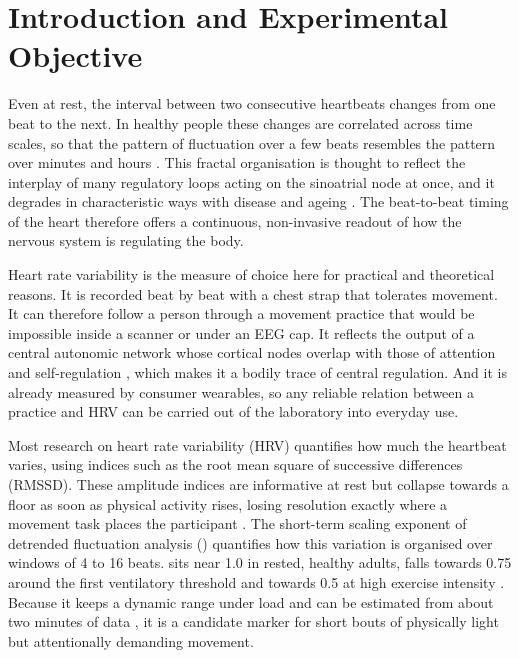 \section{Introduction and Experimental Objective}
\label{sec:intro}

Even at rest, the interval between two consecutive heartbeats changes from one beat to the next. In healthy people these changes are correlated across time scales, so that the pattern of fluctuation over a few beats resembles the pattern over minutes and hours \citep{peng1995,goldberger2002}. This fractal organisation is thought to reflect the interplay of many regulatory loops acting on the sinoatrial node at once, and it degrades in characteristic ways with disease and ageing \citep{lipsitz1992,goldberger2002}. The beat-to-beat timing of the heart therefore offers a continuous, non-invasive readout of how the nervous system is regulating the body.

Heart rate variability is the measure of choice here for practical and theoretical reasons. It is recorded beat by beat with a chest strap that tolerates movement. It can therefore follow a person through a movement practice that would be impossible inside a scanner or under an EEG cap. It reflects the output of a central autonomic network whose cortical nodes overlap with those of attention and self-regulation \citep{benarroch1993,thayer2000}, which makes it a bodily trace of central regulation. And it is already measured by consumer wearables, so any reliable relation between a practice and HRV can be carried out of the laboratory into everyday use.

Most research on heart rate variability (HRV) quantifies how much the heartbeat varies, using indices such as the root mean square of successive differences (RMSSD). These amplitude indices are informative at rest but collapse towards a floor as soon as physical activity rises, losing resolution exactly where a movement task places the participant \citep{gronwald2020biomarker}. The short-term scaling exponent of detrended fluctuation analysis (\aone) quantifies how this variation is organised over windows of 4 to 16 beats. \al{} sits near 1.0 in rested, healthy adults, falls towards 0.75 around the first ventilatory threshold and towards 0.5 at high exercise intensity \citep{rogers2021threshold,rogers2022update}. Because it keeps a dynamic range under load and can be estimated from about two minutes of data \citep{chen2002,rogers2022update}, it is a candidate marker for short bouts of physically light but attentionally demanding movement.

